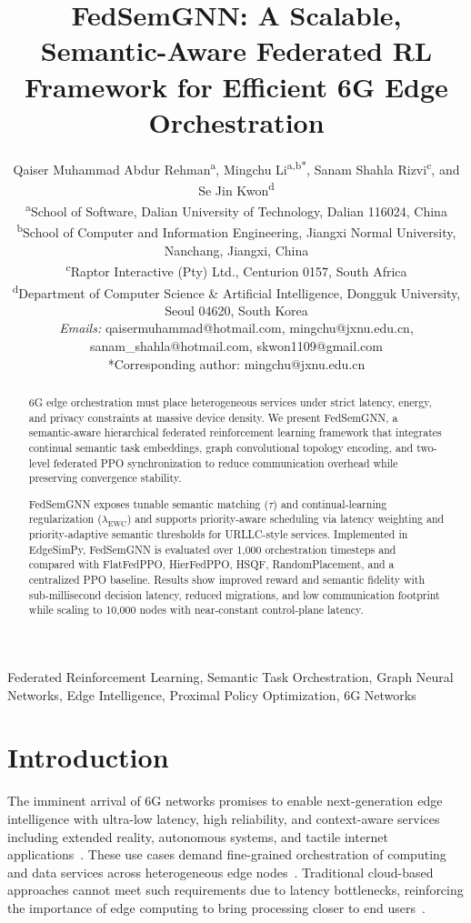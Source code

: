 \documentclass[conference]{IEEEtran}
\title{FedSemGNN: A Scalable, Semantic-Aware Federated RL Framework for Efficient 6G Edge Orchestration}
\author{
		Qaiser Muhammad Abdur Rehman\textsuperscript{a}, 
		Mingchu Li\textsuperscript{a,b*}, 
		Sanam Shahla Rizvi\textsuperscript{c}, 
		and Se Jin Kwon\textsuperscript{d} \\[4pt]
		\textsuperscript{a}School of Software, Dalian University of Technology, Dalian 116024, China\\
		\textsuperscript{b}School of Computer and Information Engineering, Jiangxi Normal University, Nanchang, Jiangxi, China\\
		\textsuperscript{c}Raptor Interactive (Pty) Ltd., Centurion 0157, South Africa\\
		\textsuperscript{d}Department of Computer Science \& Artificial Intelligence, Dongguk University, Seoul 04620, South Korea\\[6pt]
		\textit{Emails:} qaisermuhammad@hotmail.com, mingchu@jxnu.edu.cn, 
		sanam\_shahla@hotmail.com, skwon1109@gmail.com\\[2pt]
		*Corresponding author: mingchu@jxnu.edu.cn
	}
\begin{document}
		
		\maketitle
		
		\begin{abstract}
			6G edge orchestration must place heterogeneous services under strict latency, energy, and privacy constraints at massive device density. We present FedSemGNN, a semantic-aware hierarchical federated reinforcement learning framework that integrates continual semantic task embeddings, graph convolutional topology encoding, and two-level federated PPO synchronization to reduce communication overhead while preserving convergence stability.
			
			FedSemGNN exposes tunable semantic matching ($\tau$) and continual-learning regularization ($\lambda_{\mathrm{EWC}}$) and supports priority-aware scheduling via latency weighting and priority-adaptive semantic thresholds for URLLC-style services. Implemented in EdgeSimPy, FedSemGNN is evaluated over 1,000 orchestration timesteps and compared with FlatFedPPO, HierFedPPO, HSQF, RandomPlacement, and a centralized PPO baseline. Results show improved reward and semantic fidelity with sub-millisecond decision latency, reduced migrations, and low communication footprint while scaling to 10,000 nodes with near-constant control-plane latency.
		\end{abstract}
		
		
		\begin{IEEEkeywords}
			Federated Reinforcement Learning, Semantic Task Orchestration, Graph Neural Networks, Edge Intelligence, Proximal Policy Optimization, 6G Networks
		\end{IEEEkeywords}
		
		
		\section{Introduction}
		
		The imminent arrival of 6G networks promises to enable next-generation edge intelligence with ultra-low latency, high reliability, and context-aware services including extended reality, autonomous systems, and tactile internet applications~\cite{cui2025}. These use cases demand fine-grained orchestration of computing and data services across heterogeneous edge nodes~\cite{shi2023}. Traditional cloud-based approaches cannot meet such requirements due to latency bottlenecks, reinforcing the importance of edge computing to bring processing closer to end users~\cite{vahabi2025}.
		
\end{document}
